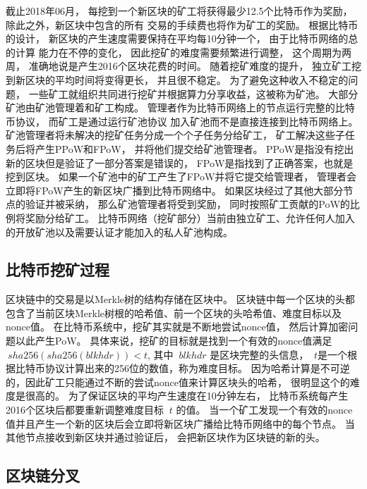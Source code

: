 \documentclass[a4paper, 11pt]{article}
\begin{document}
\begin{CJK*}{UTF8}{gbsn}
    截止2018年06月，
    每挖到一个新区块的矿工将获得最少12.5个比特币作为奖励，
    除此之外，新区块中包含的所有
    交易的手续费也将作为矿工的奖励。
    根据比特币的设计，
    新区块的产生速度需要保持在平均每10分钟一个，
    由于比特币网络的总的计算
    能力在不停的变化，
    因此挖矿的难度需要频繁进行调整，
    这个周期为两周，
    准确地说是产生2016个区块花费的时间。
    随着挖矿难度的提升，
    独立矿工挖到新区块的平均时间将变得更长，
    并且很不稳定。
    为了避免这种收入不稳定的问题，
    一些矿工就组织共同进行挖矿并根据算力分享收益，这被称为矿池。
    大部分矿池由矿池管理着和矿工构成。
    管理者作为比特币网络上的节点运行完整的比特币协议，
    而矿工是通过运行矿池协议\cite{ref_web2}
    加入矿池而不是直接连接到比特币网络上。
    矿池管理者将未解决的挖矿任务分成一个个子任务分给矿工，
    矿工解决这些子任务后将产生PPoW和FPoW，
    并将他们提交给矿池管理者。
    PPoW是指没有挖出新的区块但是验证了一部分答案是错误的，
    FPoW是指找到了正确答案，也就是挖到区块。
    如果一个矿池中的矿工产生了FPoW并将它提交给管理者，
    管理者会立即将FPoW产生的新区块广播到比特币网络中。
    如果区块经过了其他大部分节点的验证并被采纳，
    那么矿池管理者将受到奖励，
    同时按照矿工贡献的PoW的比例将奖励分给矿工。
    比特币网络（挖矿部分）当前由独立矿工、允许任何人加入的开放矿池以及需要认证才能加入的私人矿池构成。

    
    \subsection{比特币挖矿过程}

    \indent

    区块链中的交易是以Merkle树\cite{ref_article2}的结构存储在区块中。
    区块链中每一个区块的头都包含了当前区块Merkle树根的哈希值、前一个区块的头哈希值、难度目标以及nonce值。
    在比特币系统中，挖矿其实就是不断地尝试nonce值，
    然后计算加密问题以此产生PoW。
    具体来说，挖矿的目标就是找到一个有效的nonce值满足$\ sha256(sha256(blkhdr)) < t $,
    其中 $\ blkhdr$ 是区块完整的头信息，
    $\ t$是一个根据比特币协议计算出来的256位的数值，称为难度目标。
    因为哈希计算是不可逆的，因此矿工只能通过不断的尝试nonce值来计算区块头的哈希，
    很明显这个的难度是很高的。
    为了保证区块的平均产生速度在10分钟左右，
    比特币系统每产生2016个区块后都要重新调整难度目标 $\ t$ 的值。
    当一个矿工发现一个有效的nonce值并且产生一个新的区块后会立即将新区块广播给比特币网络中的每个节点。
    当其他节点接收到新区块并通过验证后，
    会把新区块作为区块链的新的头。

    \subsection{区块链分叉}


\end{CJK*}
\end{document}
